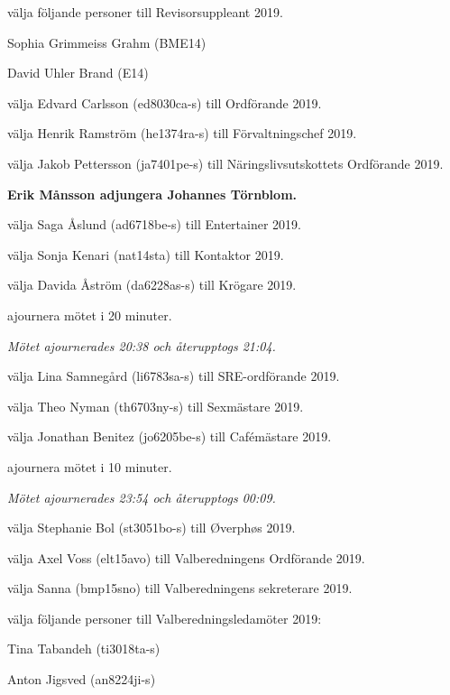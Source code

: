 \documentclass[10pt]{article}
\begin{document}
\begin{paragrafer}
\begin{paralist}
    \Mba välja följande personer till Revisorsuppleant 2019.
    \begin{tightdashlist}
        \item Sophia Grimmeiss Grahm (BME14)
        \item David Uhler Brand (E14)
    \end{tightdashlist}

    \Mba välja Edvard Carlsson  (ed8030ca-s) till Ordförande 2019.

    \Mba välja Henrik Ramström (he1374ra-s) till Förvaltningschef 2019.

    \Mba välja Jakob Pettersson (ja7401pe-s) till Näringslivsutskottets Ordförande 2019.

    \textbf{Erik Månsson \ypa adjungera Johannes Törnblom.}

    \textbf{\Mbaby}

    \Mba välja Saga Åslund (ad6718be-s) till Entertainer 2019.

    \Mba välja Sonja Kenari (nat14sta) till Kontaktor 2019.

    \Mba välja Davida Åström (da6228as-s) till Krögare 2019.
    
    \Mba ajournera mötet i 20 minuter.

    \emph{Mötet ajournerades 20:38 och återupptogs 21:04.}

    \Mba välja Lina Samnegård (li6783sa-s) till SRE-ordförande 2019.

    \Mba välja Theo Nyman (th6703ny-s) till Sexmästare 2019.

    \Mba välja Jonathan Benitez (jo6205be-s) till Cafémästare 2019.

    \Mba ajournera mötet i 10 minuter.

    \emph{Mötet ajournerades 23:54 och återupptogs 00:09.}
    
    \Mba välja Stephanie Bol (st3051bo-s) till Øverphøs 2019.
    
    
    \Mba välja Axel Voss (elt15avo) till Valberedningens Ordförande 2019.
    
    \Mba välja Sanna (bmp15sno) till Valberedningens sekreterare 2019.
    
    \Mba välja följande personer till Valberedningsledamöter 2019:
    \begin{tightdashlist}
        \item Tina Tabandeh (ti3018ta-s)
        \item Anton Jigsved (an8224ji-s)
    \end{tightdashlist}
    

\end{paralist}
\end{paragrafer}
\end{document}
